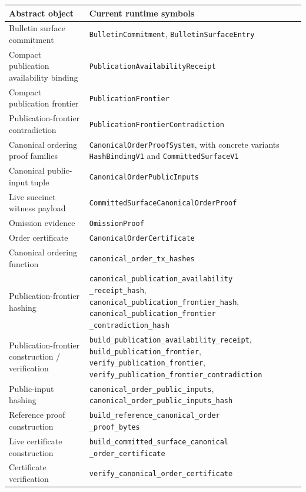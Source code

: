 \documentclass[11pt]{article}
\newcommand{\code}[1]{\texttt{#1}}
\begin{document}
\begin{center}
\scriptsize
\begin{tabularx}{\textwidth}{>{\raggedright\arraybackslash}p{} X}
\toprule
\textbf{Abstract object} & \textbf{Current runtime symbols} \\
\midrule
Bulletin surface commitment & \code{BulletinCommitment}, \code{BulletinSurfaceEntry} \\
Compact publication availability binding & \code{PublicationAvailabilityReceipt} \\
Compact publication frontier & \code{PublicationFrontier} \\
Publication-frontier contradiction & \code{PublicationFrontierContradiction} \\
Canonical ordering proof families & \code{CanonicalOrderProofSystem}, with concrete variants \code{HashBindingV1} and \code{CommittedSurfaceV1} \\
Canonical public-input tuple & \code{CanonicalOrderPublicInputs} \\
Live succinct witness payload & \code{CommittedSurfaceCanonicalOrderProof} \\
Omission evidence & \code{OmissionProof} \\
Order certificate & \code{CanonicalOrderCertificate} \\
Canonical ordering function & \code{canonical\_order\_tx\_hashes} \\
Publication-frontier hashing & \shortstack[l]{\code{canonical\_publication\_availability}\\\code{\_receipt\_hash},\\\code{canonical\_publication\_frontier\_hash},\\\code{canonical\_publication\_frontier}\\\code{\_contradiction\_hash}} \\
Publication-frontier construction / verification & \shortstack[l]{\code{build\_publication\_availability\_receipt},\\\code{build\_publication\_frontier},\\\code{verify\_publication\_frontier},\\\code{verify\_publication\_frontier\_contradiction}} \\
Public-input hashing & \shortstack[l]{\code{canonical\_order\_public\_inputs},\\\code{canonical\_order\_public\_inputs\_hash}} \\
Reference proof construction & \shortstack[l]{\code{build\_reference\_canonical\_order}\\\code{\_proof\_bytes}} \\
Live certificate construction & \shortstack[l]{\code{build\_committed\_surface\_canonical}\\\code{\_order\_certificate}} \\
Certificate verification & \code{verify\_canonical\_order\_certificate} \\
\bottomrule
\end{tabularx}
\end{center}
\end{document}
